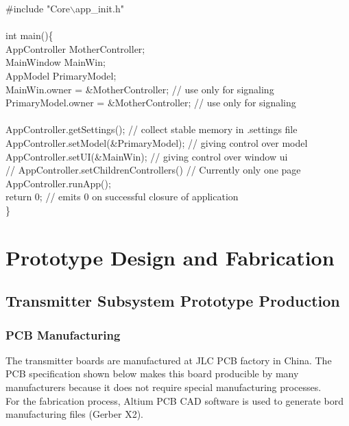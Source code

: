 \documentclass[12pt]{article}
\begin{document}
{\ttfamily
\noindent
\#include "Core$\backslash$app\_init.h"\\
\hfill \\
int main()\{\\
\indent AppController MotherController;\\
\indent MainWindow MainWin;\\
\indent AppModel PrimaryModel;\\
\indent MainWin.owner = \&MotherController; // use only for signaling\\
\indent PrimaryModel.owner = \&MotherController; // use only for signaling\\
\hfill \\
\indent AppController.getSettings(); // collect stable memory in .settings file\\
\indent AppController.setModel(\&PrimaryModel);  // giving control over model\\
\indent AppController.setUI(\&MainWin);  // giving control over window ui\\
\indent // AppController.setChildrenControllers()  // Currently only one page\\
\indent AppController.runApp();\\
\indent return 0;   // emits 0 on successful closure of application\\
\}
}


\hfill
\pagebreak
\hfill

\section{Prototype Design and Fabrication}
\subsection{Transmitter Subsystem Prototype Production}
\subsubsection{PCB Manufacturing} The transmitter boards are manufactured at JLC PCB  factory in China. The PCB specification shown below makes this board producible by many manufacturers because it does not require special manufacturing processes.\\

\noindent
For the fabrication process, Altium PCB CAD software is used to generate bord manufacturing files (Gerber X2).\\
 
\end{document}
